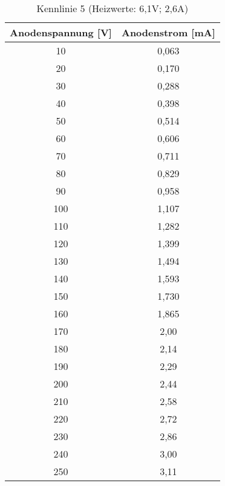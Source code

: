 \begin{table}[h]
	\begin{center}
		\begin{tabular}{cc}
			Anodenspannung [V] & Anodenstrom [mA]\\ \hline
			10	&0,063\\
			20	&0,170\\
			30	&0,288\\
			40	&0,398\\
			50	&0,514\\
			60	&0,606\\
			70	&0,711\\
			80	&0,829\\
			90	&0,958\\
			100	&1,107\\
			110	&1,282\\
			120	&1,399\\
			130	&1,494\\
			140	&1,593\\
			150	&1,730\\
			160	&1,865\\
			170	&2,00\\
			180	&2,14\\
			190	&2,29\\
			200	&2,44\\
			210	&2,58\\
			220	&2,72\\
			230	&2,86\\
			240	&3,00\\
			250	&3,11
		\end{tabular}
		\caption{Kennlinie 5 (Heizwerte: 6,1V; 2,6A)}
		\label{taba5}
	\end{center}
\end{table}